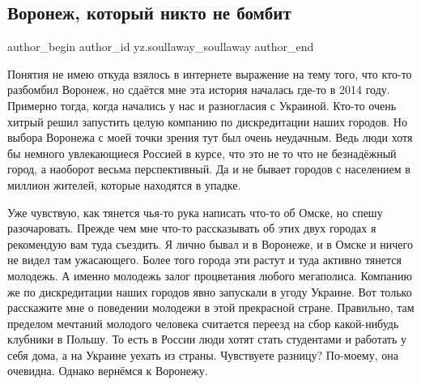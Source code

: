  
 
 
 
 
 
\subsection{Воронеж, который никто не бомбит}
\label{sec:04_02_2022.yz.soullaway_soullaway.1.voronezh_nikto_ne_bombit}
 
\ifcmt
 author_begin
   author_id yz.soullaway_soullaway
 author_end
\fi

Понятия не имею откуда взялось в интернете выражение на тему того, что кто-то
разбомбил Воронеж, но сдаётся мне эта история началась где-то в 2014 году.
Примерно тогда, когда начались у нас и разногласия с Украиной. Кто-то очень
хитрый решил запустить целую компанию по дискредитации наших городов. Но выбора
Воронежа с моей точки зрения тут был очень неудачным. Ведь люди хотя бы немного
увлекающиеся Россией в курсе, что это не то что не безнадёжный город, а
наоборот весьма перспективный. Да и не бывает городов с населением в миллион
жителей, которые находятся в упадке.

Уже чувствую, как тянется чья-то рука написать что-то об Омске, но спешу
разочаровать. Прежде чем мне что-то рассказывать об этих двух городах я
рекомендую вам туда съездить. Я лично бывал и в Воронеже, и в Омске и ничего не
видел там ужасающего. Более того города эти растут и туда активно тянется
молодежь. А именно молодежь залог процветания любого мегаполиса. Компанию же по
дискредитации наших городов явно запускали в угоду Украине. Вот только
расскажите мне о поведении молодежи в этой прекрасной стране. Правильно, там
пределом мечтаний молодого человека считается переезд на сбор какой-нибудь
клубники в Польшу. То есть в России люди хотят стать студентами и работать у
себя дома, а на Украине уехать из страны. Чувствуете разницу? По-моему, она
очевидна. Однако вернёмся к Воронежу.

